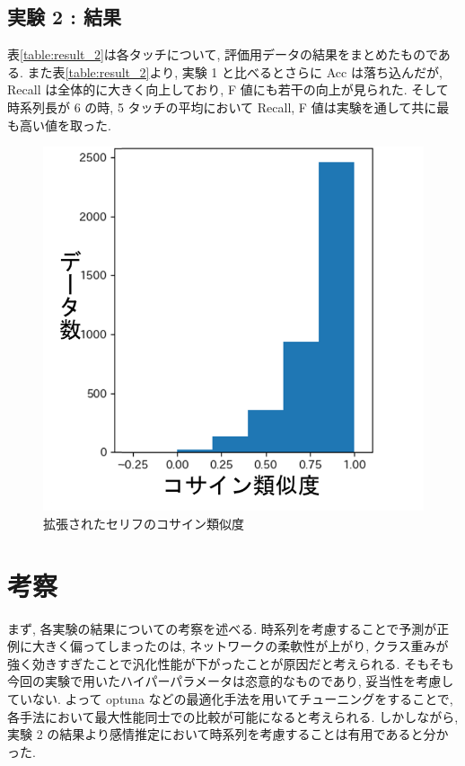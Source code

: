 \documentclass[twocolumn]{jarticle}     %
\begin{document}
\subsection{実験 2 : 結果}
表\ref{table:result_2}は各タッチについて, 評価用データの結果をまとめたものである.
また表\ref{table:result_2}より, 実験 1 と比べるとさらに Acc は落ち込んだが, Recall は全体的に大きく向上しており, F 値にも若干の向上が見られた.
そして時系列長が 6 の時, 5 タッチの平均において Recall, F 値は実験を通して共に最も高い値を取った.


\begin{figure}[tb]
  \centering
  \includegraphics[scale=0.45]{cos_similarity.png}
  \caption{拡張されたセリフのコサイン類似度}
  \label{fig:cos}
\end{figure}

\section{考察}
まず, 各実験の結果についての考察を述べる.
時系列を考慮することで予測が正例に大きく偏ってしまったのは, ネットワークの柔軟性が上がり, クラス重みが強く効きすぎたことで汎化性能が下がったことが原因だと考えられる. そもそも今回の実験で用いたハイパーパラメータは恣意的なものであり, 妥当性を考慮していない. よって optuna などの最適化手法を用いてチューニングをすることで, 各手法において最大性能同士での比較が可能になると考えられる. しかしながら, 実験 2 の結果より感情推定において時系列を考慮することは有用であると分かった.
\end{document}
